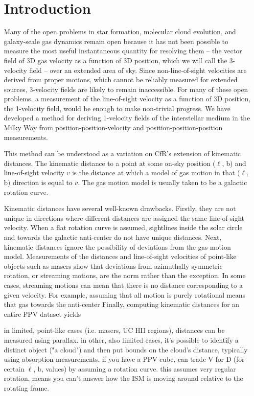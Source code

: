 \section{Introduction}
Many of the open problems in star formation, molecular cloud evolution, and galaxy-scale gas dynamics remain open because it has not been possible to measure the most useful instantaneous quantity for resolving them -- the vector field of 3D gas velocity as a function of 3D position, which we will call the 3-velocity field -- over an extended area of sky.
Since non-line-of-sight velocities are derived from proper motions, which cannot be reliably measured for extended sources, 3-velocity fields are likely to remain inaccessible. 
For many of these open problems, a measurement of the line-of-sight velocity as a function of 3D position, the 1-velocity field, would be enough to make non-trivial progress. 
We have developed a method for deriving 1-velocity fields of the interstellar medium in the Milky Way from position-position-velocity and position-position-position measurements. 

This method can be understood as a variation on CfR's extension of kinematic distances.
The kinematic distance to a point at some on-sky position ($\ell$, b) and line-of-sight velocity $v$ is the distance at which a model of gas motion in that ($\ell$, b) direction is equal to $v$.
The gas motion model is usually taken to be a galactic rotation curve. 

Kinematic distances have several well-known drawbacks.
Firstly, they are not unique in directions where different distances are assigned the same line-of-sight velocity.
When a flat rotation curve is assumed, sightlines inside the solar circle and towards the galactic anti-center do not have unique distances. 
Next, kinematic distances ignore the possibility of deviations from the gas motion model.
Measurements of the distances and line-of-sight velocities of point-like objects such as masers show that deviations from azimuthally symmetric rotation, or streaming motions, are the norm rather than the exception.
In some cases, streaming motions can mean that there is no distance corresponding to a given velocity. 
For example, assuming that all motion is purely rotational means that gas towards the anti-center 
Finally, computing kinematic distances for an entire PPV dataset yields 

in limited, point-like cases (i.e. masers, UC HII regions), distances can be measured using parallax.
in other, also limited cases, it's possible to identify a distinct object ("a cloud") and then put bounds on the cloud's distance, typically using absorption measurements. 
if you have a PPV cube, can trade V for D (for certain $\ell$, b, values) by assuming a rotation curve. 
this assumes very regular rotation, means you can't answer how the ISM is moving around relative to the rotating frame.

